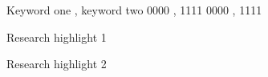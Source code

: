 \documentclass[review,12pt,authoryear]{elsarticle}
\begin{document}
\begin{linenumbers}
\begin{frontmatter}
\begin{keyword}
Keyword one \sep{} keyword two
\PACS{} 0000 \sep{} 1111
\MSC{} 0000 \sep{} 1111
\end{keyword}
\begin{highlights}
  \item Research highlight 1
  \item Research highlight 2
\end{highlights}
\end{frontmatter}



\end{linenumbers}
\end{document}

